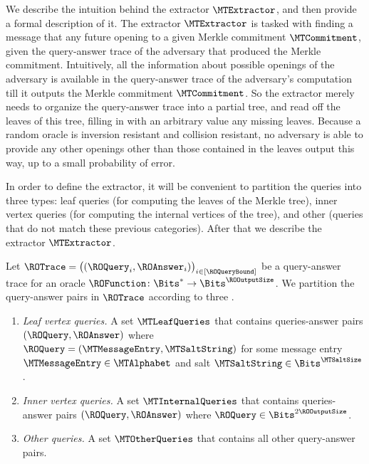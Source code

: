 We describe the intuition behind the extractor $\MTExtractor$, and then provide a formal description of it. The extractor $\MTExtractor$ is tasked with finding a message that  any future opening to a given Merkle commitment $\MTCommitment$, given the query-answer trace of the adversary that produced the Merkle commitment. Intuitively, all the information about possible openings of the adversary is available in the query-answer trace of the adversary's computation till it outputs the Merkle commitment $\MTCommitment$. So the extractor merely needs to organize the query-answer trace into a partial tree, and read off the leaves of this tree, filling in with an arbitrary value any missing leaves. Because a random oracle is inversion resistant and collision resistant, no adversary is able to provide any other openings other than those contained in the leaves output this way, up to a small probability of error.

In order to define the extractor, it will be convenient to partition the queries into three types: leaf queries (for computing the leaves of the Merkle tree), inner vertex queries (for computing the internal vertices of the tree), and other (queries that do not match these previous categories). After that we describe the extractor $\MTExtractor$.

\begin{definition}
\label{definition:query-types}
Let $\ROTrace = \big( (\ROQuery_{i},\ROAnswer_{i}) \big)_{i \in [\ROQueryBound]}$ be a query-answer trace for an oracle $\ROFunction \colon \Bits^{*} \to \Bits^{\ROOutputSize}$. We partition the query-answer pairs in $\ROTrace$ according to three .
\begin{enumerate}[nolistsep]
  \item \emph{Leaf vertex queries.}
  A set $\MTLeafQueries$ that contains queries-answer pairs $(\ROQuery,\ROAnswer)$ where $\ROQuery=(\MTMessageEntry,\MTSaltString)$ for some message entry $\MTMessageEntry \in \MTAlphabet$ and salt $\MTSaltString \in \Bits^{\MTSaltSize}$.
  \item \emph{Inner vertex queries.}
  A set $\MTInternalQueries$ that contains queries-answer pairs $(\ROQuery,\ROAnswer)$ where $\ROQuery \in \Bits^{2\ROOutputSize}$.
  \item \emph{Other queries.}
  A set $\MTOtherQueries$ that contains all other query-answer pairs.
\end{enumerate}
\end{definition}

